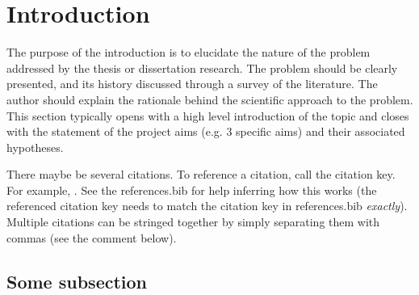 \center

\section{Introduction}

\raggedright

The purpose of the introduction is to elucidate the nature of the problem
addressed by the thesis or dissertation research. The problem should be clearly presented, and its history discussed through a survey of the literature.
The author should explain the rationale behind the scientific approach to the problem. This section typically opens with a high level introduction of the topic and closes with the statement of the project aims (e.g. 3 specific aims) and their associated hypotheses.

There maybe be several citations. To reference a citation, call the citation key. For example, \cite{OHSU-overleaf-dissertation-template}. See the references.bib for help inferring how this works (the referenced citation key needs to match the citation key in references.bib \textit{exactly}). Multiple citations can be stringed together by simply separating them with commas (see the comment below). 


\subsection{Some subsection}
\lipsum
